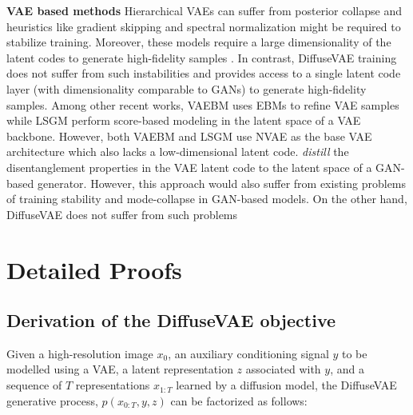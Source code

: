 \documentclass[10pt]{article} \usepackage[accepted]{tmlr}
\begin{document}
\noindent
\textbf{VAE based methods}
Hierarchical VAEs \citep{sonderby2016ladder, vahdat2021nvae, child2021deep, razavi2019generating} can suffer from posterior collapse and heuristics like gradient skipping and spectral normalization \citep{miyato2018spectral} might be required to stabilize training. Moreover, these models require a large dimensionality of the latent codes to generate high-fidelity samples \citep{vahdat2021nvae, razavi2019generating}. In contrast, DiffuseVAE training does not suffer from such instabilities and provides access to a single latent code layer (with dimensionality comparable to GANs) to generate high-fidelity samples. Among other recent works, VAEBM \citep{xiao2021vaebm} uses EBMs \citep{du2020implicit, nijkamp2019learning} to refine VAE samples while LSGM \citep{vahdat2021nvae} perform score-based modeling in the latent space of a VAE backbone. However, both VAEBM and LSGM use NVAE \citep{vahdat2021nvae} as the base VAE architecture which also lacks a low-dimensional latent code. \citep{lee2020highfidelity} \textit{distill} the disentanglement properties in the VAE latent code to the latent space of a GAN-based generator. However, this approach would also suffer from existing problems of training stability and mode-collapse in GAN-based models. On the other hand, DiffuseVAE does not suffer from such problems
\newpage
\section{Detailed Proofs}
\label{sec:appendix_c}

\subsection{Derivation of the DiffuseVAE objective}
\label{subsec:appendix_c_1}
Given a high-resolution image $x_0$, an auxiliary conditioning signal $y$ to be modelled using a VAE, a latent representation $z$ associated with $y$, and a sequence of $T$ representations $x_{1:T}$ learned by a diffusion model, the DiffuseVAE generative process, $p(x_{0:T}, y, z)$ can be factorized as follows:
\end{document}
